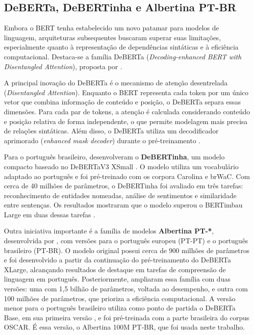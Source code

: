 \documentclass[
    12pt,                %
    openright,           %
    oneside,             %
    a4paper,             %
    english,             %
    brazil               %
]{abntex2}
\begin{document}
\subsection{DeBERTa, DeBERTinha e Albertina PT-BR}

Embora o BERT tenha estabelecido um novo patamar para modelos de linguagem, arquiteturas subsequentes buscaram superar suas limitações, especialmente quanto à representação de dependências sintáticas e à eficiência computacional. Destaca-se a família DeBERTa (\textit{Decoding-enhanced BERT with Disentangled Attention}), proposta por .

A principal inovação do DeBERTa é o mecanismo de atenção desentrelada (\textit{Disentangled Attention}). Enquanto o BERT representa cada token por um único vetor que combina informação de conteúdo e posição, o DeBERTa separa essas dimensões. Para cada par de tokens, a atenção é calculada considerando conteúdo e posição relativa de forma independente, o que permite modelagem mais precisa de relações sintáticas. Além disso, o DeBERTa utiliza um decodificador aprimorado (\textit{enhanced mask decoder}) durante o pré-treinamento \cite{He2021}.

Para o português brasileiro,  desenvolveram o \textbf{DeBERTinha}, um modelo compacto baseado no DeBERTaV3 XSmall \cite{He2023}. O modelo utiliza um vocabulário adaptado ao português e foi pré-treinado com os corpora Carolina e brWaC. Com cerca de 40 milhões de parâmetros, o DeBERTinha foi avaliado em três tarefas: reconhecimento de entidades nomeadas, análise de sentimentos e similaridade entre sentenças. Os resultados mostraram que o modelo superou o BERTimbau Large em duas dessas tarefas \cite{Campiotti2023}.

Outra iniciativa importante é a família de modelos \textbf{Albertina PT-*}, desenvolvida por , com versões para o português europeu (PT-PT) e o português brasileiro (PT-BR). O modelo original possui cerca de 900 milhões de parâmetros e foi desenvolvido a partir da continuação do pré-treinamento do DeBERTa XLarge, alcançando resultados de destaque em tarefas de compreensão de linguagem em português. Posteriormente,  ampliaram essa família com duas versões: uma com 1,5 bilhão de parâmetros, voltada ao desempenho, e outra com 100 milhões de parâmetros, que prioriza a eficiência computacional. A versão menor para o português brasileiro utiliza como ponto de partida o DeBERTa Base, em sua primeira versão \cite{He2021}, e foi pré-treinada com a parte brasileira do corpus OSCAR. É essa versão, o Albertina 100M PT-BR, que foi usada neste trabalho.
\end{document}
